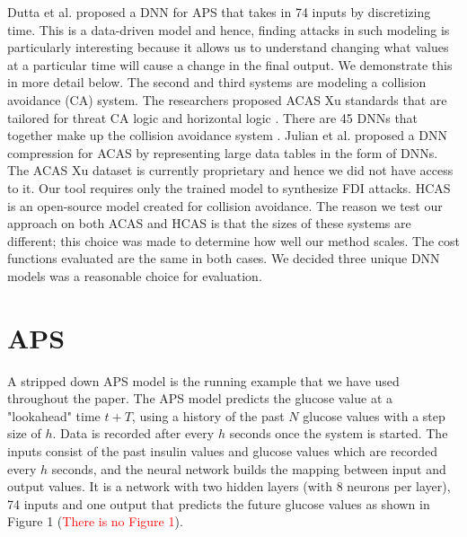 Dutta et al. \cite{10.1007/978-3-319-99429-1_11} proposed a DNN for APS that takes in 74 inputs by discretizing time. This is a data-driven model and hence, finding attacks in such modeling is particularly interesting because it allows us to understand changing what values at a particular time will cause a change in the final output. We demonstrate this in more detail below. The second and third systems are modeling a collision avoidance (CA) system. The researchers proposed ACAS Xu standards that are tailored for threat CA logic and horizontal logic \cite{7778055}. There are 45 DNNs that together make up the collision avoidance system \cite{Julian_2019}.  Julian et al. proposed a DNN compression for ACAS by representing large data tables in the form of DNNs. The ACAS Xu dataset is currently proprietary and hence we did not have access to it. Our tool requires only the trained model to synthesize FDI attacks. HCAS is an open-source model created for collision avoidance. The reason we test our approach on both ACAS and HCAS is that the sizes of these systems are different; this choice was made to determine how well our method scales. The cost functions evaluated are the same in both cases. We decided three unique DNN models was a reasonable choice for evaluation.

\section{APS}
A stripped down APS model is the running example that we have used throughout the paper. 
The APS model predicts the glucose value at a "lookahead" time $t + T$, using a history of the past $N$ glucose values with a step size of $h$. Data is recorded after every $h$ seconds once the system is started. The inputs consist of the past insulin values and glucose values which are recorded every $h$ seconds, and the neural network builds the mapping between input and output values. It is a network with two hidden layers (with 8 neurons per layer), 74 inputs and one output that predicts the future glucose values as shown in Figure 1 (\textcolor{red}{There is no Figure 1}).


